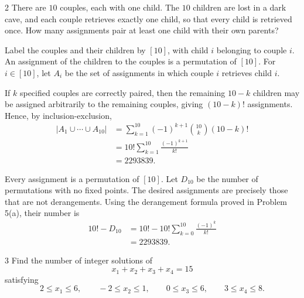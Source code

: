 \documentclass[11pt,oneside]{article}
\begin{document}
\begin{problem}{2}
There are $10$ couples, each with one child. The $10$ children are lost in a dark cave, and each couple retrieves exactly one child, so that every child is retrieved once. How many assignments pair at least one child with their own parents?
\end{problem}

\begin{solution}[1]
Label the couples and their children by $[10]$, with child $i$ belonging to couple $i$. An assignment of the children to the couples is a permutation of $[10]$. For $i\in[10]$, let $A_i$ be the set of assignments in which couple $i$ retrieves child $i$.

If $k$ specified couples are correctly paired, then the remaining $10-k$ children may be assigned arbitrarily to the remaining couples, giving $(10-k)!$ assignments. Hence, by inclusion-exclusion,
\[
\begin{aligned}
    |A_1\cup\cdots\cup A_{10}|
    &=\sum_{k=1}^{10}(-1)^{k+1}\binom{10}{k}(10-k)!\\
    &=10!\sum_{k=1}^{10}\frac{(-1)^{k+1}}{k!}\\
    &=2293839.
\end{aligned}
\]
\end{solution}

\begin{solution}[2]
Every assignment is a permutation of $[10]$. Let $D_{10}$ be the number of permutations with no fixed points. The desired assignments are precisely those that are not derangements. Using the derangement formula proved in Problem 5(a), their number is
\[
\begin{aligned}
    10!-D_{10}
    &=10!-10!\sum_{k=0}^{10}\frac{(-1)^k}{k!}\\
    &=2293839.
\end{aligned}
\]
\end{solution}

\begin{problem}{3}
Find the number of integer solutions of
\[
    x_1+x_2+x_3+x_4=15
\]
satisfying
\[
    2\leq x_1\leq6,
    \qquad
    -2\leq x_2\leq1,
    \qquad
    0\leq x_3\leq6,
    \qquad
    3\leq x_4\leq8.
\]
\end{problem}
\end{document}

